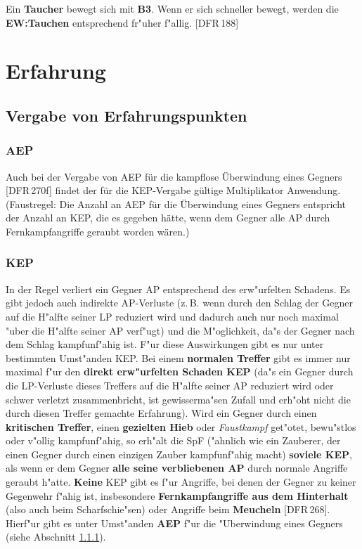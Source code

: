 \documentclass[10pt,a4paper,germanpar]{article}
\begin{document}
Ein \textbf{Taucher} bewegt sich mit \textbf{B3}. Wenn er sich
schneller bewegt, werden die \textbf{EW:Tauchen} entsprechend fr"uher
f"allig. [DFR\,188]

\section{Erfahrung}

\subsection{Vergabe von Erfahrungspunkten}

\subsubsection{AEP}
\label{aep}

Auch bei der Vergabe von AEP für die kampflose Überwindung eines
Gegners [DFR\,270f] findet der für die KEP-Vergabe gültige
Multiplikator Anwendung. (Faustregel: Die Anzahl an AEP für die
Überwindung eines Gegners entspricht der Anzahl an KEP, die es gegeben
hätte, wenn dem Gegner alle AP durch Fernkampfangriffe geraubt worden
wären.)

\subsubsection{KEP}

In der Regel verliert ein Gegner AP entsprechend des erw"urfelten
Schadens. Es gibt jedoch auch indirekte AP-Verluste (z.\,B. wenn durch
den Schlag der Gegner auf die H"alfte seiner LP reduziert wird und
dadurch auch nur noch maximal "uber die H"alfte seiner AP verf"ugt)
und die M"oglichkeit, da"s der Gegner nach dem Schlag kampfunf"ahig
ist. F"ur diese Auswirkungen gibt es nur unter bestimmten Umst"anden
KEP. Bei einem \textbf{normalen Treffer} gibt es immer nur maximal
f"ur den \textbf{direkt erw"urfelten Schaden KEP} (da"s ein Gegner
durch die LP-Verluste dieses Treffers auf die H"alfte seiner AP
reduziert wird oder schwer verletzt zusammenbricht, ist gewisserma"sen
Zufall und erh"oht nicht die durch diesen Treffer gemachte
Erfahrung). Wird ein Gegner durch einen \textbf{kritischen Treffer},
einen \textbf{gezielten Hieb} oder \emph{Faustkampf} get"otet,
bewu"stlos oder v"ollig kampfunf"ahig, so erh"alt die SpF ("ahnlich
wie ein Zauberer, der einen Gegner durch einen einzigen Zauber
kampfunf"ahig macht) \textbf{soviele KEP}, als wenn er dem Gegner
\textbf{alle seine verbliebenen AP} durch normale Angriffe geraubt
h"atte.  \textbf{Keine} KEP gibt es f"ur Angriffe, bei denen der
Gegner zu keiner Gegenwehr f"ahig ist, insbesondere
\textbf{Fernkampfangriffe aus dem Hinterhalt} (also auch beim
Scharfschie"sen) oder Angriffe beim \textbf{Meucheln}
[DFR\,268]. Hierf"ur gibt es unter Umst"anden \textbf{AEP} f"ur die
"Uberwindung eines Gegners (siehe Abschnitt \ref{aep}).
\end{document}
